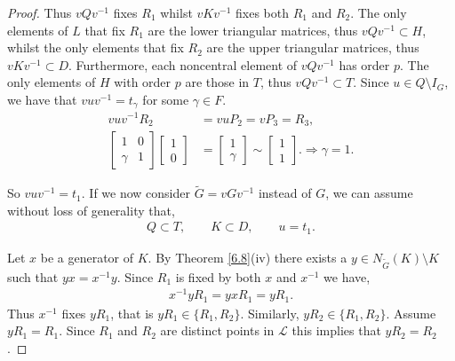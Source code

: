 \begin{proof}
Thus $vQv^{-1}$ fixes $R_1$ whilst $vKv^{-1}$ fixes both $R_1$ and $R_2$. The only elements of $L$ that fix $R_1$ are the lower triangular matrices, thus  $vQv^{-1} \subset H$, whilst the only elements that fix $R_2$ are the upper triangular matrices, thus $vKv^{-1} \subset D$. Furthermore, each noncentral element of $vQv^{-1}$ has order $p$. The only elements of $H$ with order $p$ are those in $T$, thus $vQv^{-1} \subset T$. Since $u \in Q \setminus I_G$, we have that $v u v^{-1} = t_\gamma$ for some $\gamma \in F$.
\begin{align*} v u v^{-1}R_2 &= v u P_2 = v P_3 = R_3,
\\[1.5ex] \begin{bmatrix} 1 & 0\\ \gamma & 1 \end{bmatrix} \begin{bmatrix} 1 \\ 0 \end{bmatrix} &= \begin{bmatrix} 1 \\ \gamma  \end{bmatrix} \sim \begin{bmatrix} 1 \\ 1 \end{bmatrix}. \Longrightarrow \gamma = 1.
\end{align*}

So $v u v^{-1} = t_1$. If we now consider $\widetilde{G} = vGv^{-1}$ instead of $G$, we can assume without loss of generality that,
\begin{align*} Q \subset T, \qquad K \subset D, \qquad u = t_1.
\end{align*}

Let $x$ be a generator of $K$. By Theorem \ref{6.8}(iv) there exists a $y \in N_{\widetilde{G}}(K) \! \setminus \! K$ such that $y x = x^{-1} y$. Since $R_1$ is fixed by both $x$ and $x^{-1}$ we have,
\begin{align*} x^{-1} y R_1 =  y x R_1 = y R_1.
\end{align*}
Thus $x^{-1}$ fixes $y R_1$, that is $y R_1 \in \{ R_1, R_2 \}$. Similarly, $y R_2 \in \{ R_1, R_2 \}$. Assume $y R_1 = R_1$. Since $R_1$ and $R_2$ are distinct points in $\mathscr{L}$ this implies that $y R_2 = R_2$.


\end{proof}
